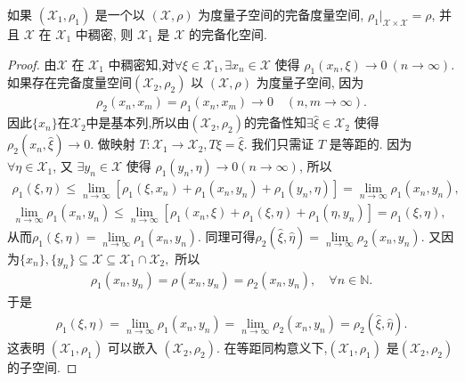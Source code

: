 \documentclass[../../main.tex]{subfiles}%
\begin{document}
\begin{proposition}\label{proposition:稠密的度量子空间得到完备化空间}
如果 $(\mathscr{X}_1,\rho_1)$ 是一个以 $(\mathscr{X},\rho)$ 为度量子空间的完备度量空间, $\rho_1|_{\mathscr{X}\times\mathscr{X}}=\rho$, 并且 $\mathscr{X}$ 在 $\mathscr{X}_1$ 中稠密, 则 $\mathscr{X}_1$ 是 $\mathscr{X}$ 的完备化空间.
\end{proposition}
\begin{proof}
由$\mathscr{X}$ 在 $\mathscr{X}_1$ 中稠密知,对$\forall\xi\in\mathscr{X}_1,\exists x_n\in\mathscr{X}$ 使得 $\rho_1(x_n,\xi)\to0\ (n\to\infty)$. 如果存在完备度量空间$(\mathscr{X}_2,\rho_2)$ 以 $(\mathscr{X},\rho)$ 为度量子空间, 因为
\begin{align*}
\rho_2(x_n,x_m)=\rho_1(x_n,x_m)\to0\quad (n,m\to\infty).
\end{align*}
因此$\{x_n\}$在$\mathscr{X}_2$中是基本列,所以由$(\mathscr{X}_2,\rho_2)$的完备性知$\exists\hat{\xi}\in\mathscr{X}_2$ 使得 $\rho_2(x_n,\hat{\xi})\to0$. 做映射 $T:\mathscr{X}_1\to\mathscr{X}_2,T\xi=\hat{\xi}$. 我们只需证 $T$ 是等距的. 因为 $\forall\eta\in\mathscr{X}_1$, 又 $\exists y_n\in\mathscr{X}$ 使得 $\rho_1(y_n,\eta)\to0(n\to \infty)$, 所以
\begin{align*}
\rho_1(\xi,\eta) \leqslant \lim\limits_{n\rightarrow \infty} \left[ \rho_1(\xi,x_n) + \rho_1(x_n,y_n) + \rho_1(y_n,\eta) \right] = \lim\limits_{n\rightarrow \infty} \rho_1(x_n,y_n),\\
\lim\limits_{n\rightarrow \infty} \rho_1(x_n,y_n) \leqslant \lim\limits_{n\rightarrow \infty} \left[ \rho_1(x_n,\xi) + \rho_1(\xi,\eta) + \rho_1(\eta,y_n) \right] = \rho_1(\xi,\eta),
\end{align*}
从而$\rho_1(\xi,\eta) = \lim\limits_{n\rightarrow \infty} \rho_1(x_n,y_n).$ 同理可得$\rho_2(\hat{\xi},\hat{\eta}) = \lim\limits_{n\rightarrow \infty} \rho_2(x_n,y_n).$ 又因为$\{x_n\},\{y_n\} \subseteq \mathscr{X} \subseteq \mathscr{X}_1\cap \mathscr{X}_2,$ 所以
\begin{align*}
\rho_1(x_n,y_n) = \rho(x_n,y_n) = \rho_2(x_n,y_n),\quad \forall n\in \mathbb{N}.
\end{align*}
于是
\begin{align*}
\rho_1(\xi,\eta) = \lim\limits_{n\rightarrow \infty} \rho_1(x_n,y_n) = \lim\limits_{n\rightarrow \infty} \rho_2(x_n,y_n) = \rho_2(\hat{\xi},\hat{\eta}).
\end{align*}
这表明 $(\mathscr{X}_1,\rho_1)$ 可以嵌入 $(\mathscr{X}_2,\rho_2)$. 在等距同构意义下,$(\mathscr{X}_1,\rho_1)$ 是$(\mathscr{X}_2,\rho_2)$的子空间.
\end{proof}
\end{document}

